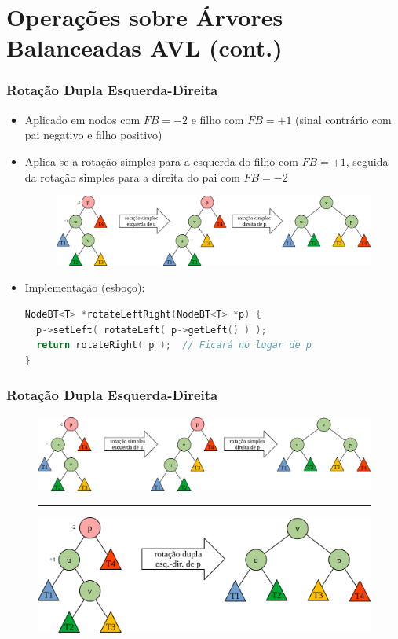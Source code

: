 \documentclass[aspectratio=169]{beamer}
\begin{document}
\section{Operações sobre Árvores Balanceadas AVL (cont.)}

\begin{frame}[fragile]\frametitle{Rotação Dupla Esquerda-Direita}
\begin{itemize}
	\item Aplicado em nodos com $FB = -2$ e filho com $FB = +1$ (sinal contrário com pai negativo e filho positivo)
	\item Aplica-se a rotação simples para a esquerda do filho com $FB = +1$, seguida da rotação simples para a direita do pai com $FB = -2$
\begin{figure}[h]
	\centering
	\includegraphics[height=0.3\paperheight]{imagens/rot_dup_esq_dir0.png}
\end{figure}
	\item Implementação (esboço):
\begin{lstlisting}[language=C++,basicstyle=\ttfamily\scriptsize]
NodeBT<T> *rotateLeftRight(NodeBT<T> *p) {
  p->setLeft( rotateLeft( p->getLeft() ) );
  return rotateRight( p );  // Ficará no lugar de p
}
\end{lstlisting}
\end{itemize}
\end{frame}

\begin{frame}[fragile]\frametitle{Rotação Dupla Esquerda-Direita}
\begin{figure}[h]
	\centering
	\includegraphics[height=0.33\paperheight]{imagens/rot_dup_esq_dir0.png}
	\vspace{3mm}
	\hrule
	\vspace{3mm}
	\includegraphics[height=0.33\paperheight]{imagens/rot_dup_esq_dir.png}
\end{figure}
\end{frame}
\end{document}
